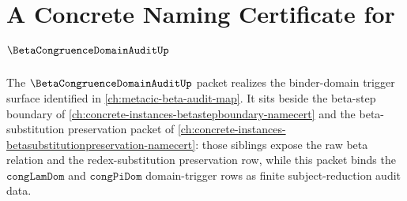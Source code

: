 \chapter{A Concrete Naming Certificate for $\BetaCongruenceDomainAuditUp$}
\label{ch:concrete-instances-beta-congruence-domain-audit-namecert}

The $\BetaCongruenceDomainAuditUp$ packet realizes the binder-domain trigger surface identified in \autoref{ch:metacic-beta-audit-map}. It sits beside the beta-step boundary of \autoref{ch:concrete-instances-betastepboundary-namecert} and the beta-substitution preservation packet of \autoref{ch:concrete-instances-betasubstitutionpreservation-namecert}: those siblings expose the raw beta relation and the redex-substitution preservation row, while this packet binds the $\texttt{congLamDom}$ and $\texttt{congPiDom}$ domain-trigger rows as finite subject-reduction audit data.



